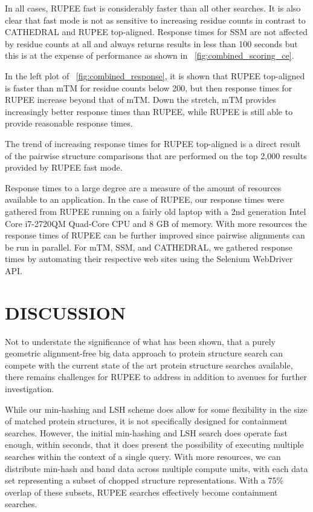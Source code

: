 \documentclass[letter,center,fleqn]{NAR}
\begin{document}
In all cases, RUPEE fast is considerably faster than all other searches. 
It is also clear that fast mode is not as sensitive to increasing residue counts in contrast to CATHEDRAL and RUPEE top-aligned.
Response times for SSM are not affected by residue counts at all and always returns results in less than 100 seconds but this is at the expense of performance as shown in \figurename~\ref{fig:combined_scoring_ce}.

In the left plot of \figurename~\ref{fig:combined_response}, it is shown that RUPEE top-aligned is faster than mTM for residue counts below 200, but then response times for RUPEE increase beyond that of mTM. 
Down the stretch, mTM provides increasingly better response times than RUPEE, while RUPEE is still able to provide reasonable response times. 

The trend of increasing response times for RUPEE top-aligned is a direct result of the pairwise structure comparisons that are performed on the top 2,000 results provided by RUPEE fast mode.

Response times to a large degree are a measure of the amount of resources available to an application. 
In the case of RUPEE, our response times were gathered from RUPEE running on a fairly old laptop with a 2nd generation Intel\textregistered{} Core\texttrademark{} i7-2720QM Quad-Core CPU and 8 GB of memory. 
With more resources the response times of RUPEE can be further improved since pairwise alignments can be run in parallel. 
For mTM, SSM, and CATHEDRAL, we gathered response times by automating their respective web sites using the Selenium WebDriver API. 

\section{DISCUSSION}

Not to understate the significance of what has been shown, that a purely geometric alignment-free big data approach to protein structure search can compete with the current state of the art protein structure searches available, there remains challenges for RUPEE to address in addition to avenues for further investigation. 

While our min-hashing and LSH scheme does allow for some flexibility in the size of matched protein structures, it is not specifically designed for containment searches. 
However, the initial min-hashing and LSH search does operate fast enough, within seconds, that it does present the possibility of executing multiple searches within the context of a single query. 
With more resources, we can distribute min-hash and band data across multiple compute units, with each data set representing a subset of chopped structure representations. 
With a 75\% overlap of these subsets, RUPEE searches effectively become containment searches. 
\end{document}
